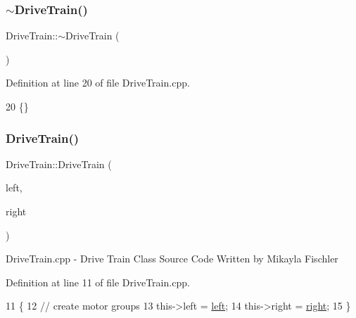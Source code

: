 \mbox{\label{class_drive_train_a5dd1c80e30d87655b22974431b16afdf}} 
\subsubsection{\texorpdfstring{$\sim$\+Drive\+Train()}{~DriveTrain()}\hspace{0.1cm}{\footnotesize\ttfamily [1/2]}}
{\footnotesize\ttfamily Drive\+Train\+::$\sim$\+Drive\+Train (\begin{DoxyParamCaption}{ }\end{DoxyParamCaption})}



Definition at line 20 of file Drive\+Train.\+cpp.


\begin{DoxyCode}
20 \{\}
\end{DoxyCode}
\mbox{\label{class_drive_train_a82ca6f487a43e353aea5ee1ff49952da}} 
\subsubsection{\texorpdfstring{Drive\+Train()}{DriveTrain()}\hspace{0.1cm}{\footnotesize\ttfamily [2/2]}}
{\footnotesize\ttfamily Drive\+Train\+::\+Drive\+Train (\begin{DoxyParamCaption}\item[{\hyperlink{class_motor_group}{Motor\+Group} $\ast$}]{left,  }\item[{\hyperlink{class_motor_group}{Motor\+Group} $\ast$}]{right }\end{DoxyParamCaption})\hspace{0.3cm}{\ttfamily [protected]}}

Drive\+Train.\+cpp -\/ Drive Train Class Source Code Written by Mikayla Fischler 

Definition at line 11 of file Drive\+Train.\+cpp.


\begin{DoxyCode}
11                                                           \{
12     \textcolor{comment}{// create motor groups}
13     this->left = \hyperlink{class_drive_train_a8343c1e4fad9e5c7e68e627f592e52ea}{left};
14     this->right = \hyperlink{class_drive_train_a1fe3a54242798b1b88eb437c7c7cf9ad}{right};
15 \}
\end{DoxyCode}
\mbox{\label{class_drive_train_a5dd1c80e30d87655b22974431b16afdf}} 
